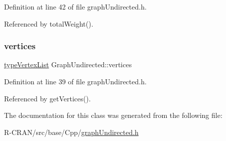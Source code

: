 Definition at line 42 of file graph\+Undirected.\+h.



Referenced by total\+Weight().

\mbox{\label{classGraphUndirected_a2b3210c4f2c00e9db131eb051c23f2e0}} 
\subsubsection{\texorpdfstring{vertices}{vertices}}
{\footnotesize\ttfamily \hyperlink{graphInterface_8h_a21d54d8a139def524d3b0d6f71ec4974}{type\+Vertex\+List} Graph\+Undirected\+::vertices\hspace{0.3cm}{\ttfamily [private]}}



Definition at line 39 of file graph\+Undirected.\+h.



Referenced by get\+Vertices().



The documentation for this class was generated from the following file\+:\begin{DoxyCompactItemize}
\item 
R-\/\+C\+R\+A\+N/src/base/\+Cpp/\hyperlink{graphUndirected_8h}{graph\+Undirected.\+h}\end{DoxyCompactItemize}
